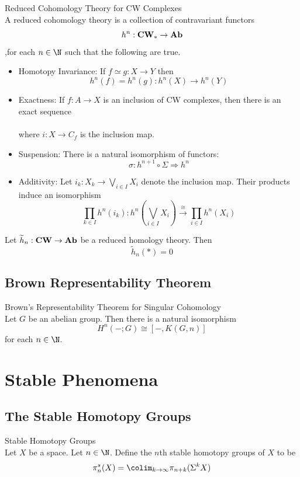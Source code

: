\documentclass[a4paper]{article}
\begin{document}
\begin{defn}{Reduced Cohomology Theory for CW Complexes}{}\\
A reduced cohomology theory is a collection of contravariant functors $$h^n:\bold{CW}_\ast\to\bold{Ab}$$,for each $n\in\N$ such that the following are true. 
\begin{itemize}
\item Homotopy Invariance: If $f\simeq g:X\to Y$ then $$h^n(f)=h^n(g):h^n(X)\to h^n(Y)$$
\item Exactness: If $f:A\to X$ is an inclusion of CW complexes, then there is an exact sequence \\
\\
where $i:X\to C_f$ is the inclusion map. 
\item Suspension: There is a natural isomorphism of functors: $$\sigma:h^{n+1}\circ\Sigma\Rightarrow h^n$$
\item Additivity: Let $i_k:X_k\to\bigvee_{i\in I}X_i$ denote the inclusion map. Their products induce an isomorphism $$\prod_{k\in I}h^n(i_k):h^n\left(\bigvee_{i\in I}X_i\right)\overset{\cong}{\longrightarrow}\prod_{i\in I}h^n(X_i)$$
\end{itemize}
\end{defn}

\begin{lmm}{}{} Let $\widetilde{h}_n:\bold{CW}\to\bold{Ab}$ be a reduced homology theory. Then $$\widetilde{h}_n(\ast)=0$$
\end{lmm}

\subsection{Brown Representability Theorem}
\begin{thm}{Brown's Representability Theorem for Singular Cohomology}{}\\
Let $G$ be an abelian group. Then there is a natural isomorphism $$H^n(-;G)\cong[-,K(G,n)]$$ for each $n\in\N$. 
\end{thm}

\pagebreak
\section{Stable Phenomena}
\subsection{The Stable Homotopy Groups}
\begin{defn}{Stable Homotopy Groups}{}\\
Let $X$ be a space. Let $n\in\N$. Define the $n$th stable homotopy groups of $X$ to be $$\pi_n^s(X)=\colim_{k\to\infty}\pi_{n+k}(\Sigma^kX)$$
\end{defn}
\end{document}
